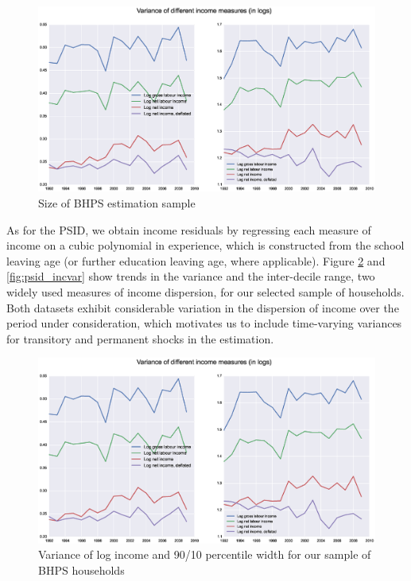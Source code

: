 \begin{figure}
\includegraphics[width=\columnwidth]{BHPS_incvar}
\caption{Size of BHPS estimation sample}
\label{fig:BHPS_sample_size}
\end{figure}


As for the PSID, we obtain
income residuals by regressing each measure of income on a cubic polynomial 
in experience, which is constructed from the school leaving age (or further
education leaving age, where applicable). Figure \ref{fig:bhps_incvar} and
\ref{fig:psid_incvar} show trends in the variance and the inter-decile range,
two widely used measures of income dispersion, for our selected sample of households.
Both datasets exhibit considerable variation in the dispersion of income over 
the period under consideration, which motivates us to include time-varying
variances for transitory and permanent shocks in the estimation.

\begin{figure}
\includegraphics[width=\columnwidth]{BHPS_incvar}
\caption{Variance of log income and 90/10 percentile width for our sample of
BHPS households}
\label{fig:bhps_incvar}
\end{figure}

